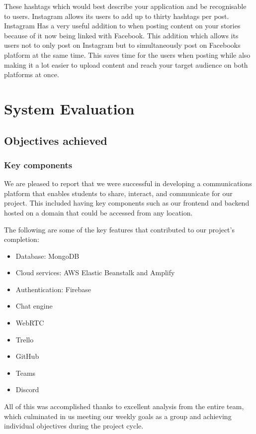 These hashtags which would best describe your application and be recognisable to users. Instagram allows its users to add up to thirty hashtags per post.
Instagram Has a very useful addition to when posting content on your stories because of it now being linked with Facebook. This addition which allows its users not to only post on Instagram but to simultaneously post on Facebooks platform at the same time. This saves time for the users when posting while also making it a lot easier to upload content and reach your target audience on both platforms at once.


\chapter{System Evaluation}
\section{Objectives achieved}
\subsection{Key components}

We are pleased to report that we were successful in developing a communications platform that enables students to share, interact, and communicate for our project. This included having key components such as our frontend and backend hosted on a domain that could be accessed from any location.\hfill \break


The following are some of the key features that contributed to our project's completion:

\hfill \break

\begin{itemize}
  \item Database: MongoDB
  \item Cloud services: AWS Elastic Beanstalk and Amplify
  \item Authentication: Firebase
  \item Chat engine	
  \item WebRTC
  \item Trello
  \item GitHub
  \item Teams
  \item Discord
\end{itemize}

\hfill \break

			         
All of this was accomplished thanks to excellent analysis from the entire team, which culminated in us meeting our weekly goals as a group and achieving individual objectives during the project cycle.


